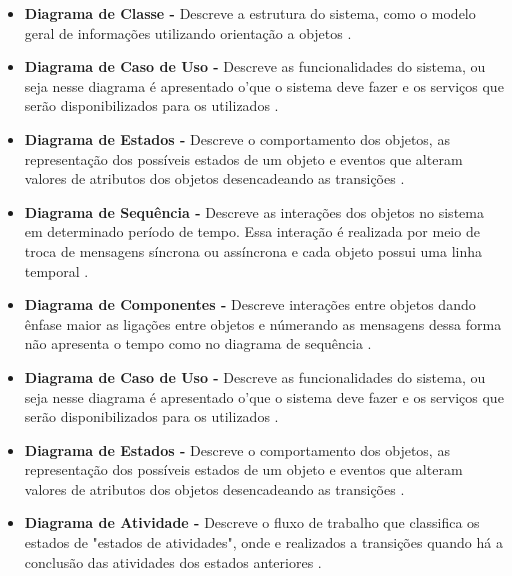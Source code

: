     \begin{itemize}
       \item \textbf{Diagrama de Classe -} 
       Descreve a estrutura do sistema, como o modelo geral de informações utilizando orientação a objetos \cite{nunesfundamental}.
        
        \item \textbf{Diagrama de Caso de Uso -} 
        Descreve as funcionalidades do sistema, ou seja nesse diagrama é apresentado o'que o sistema deve fazer e os serviços que serão disponibilizados para os utilizados \cite{nunesfundamental}.
        
        \item \textbf{Diagrama de Estados -} 
        Descreve o comportamento dos objetos, as representação dos possíveis estados de um objeto e eventos que alteram valores de atributos dos objetos desencadeando as transições \cite{uml}.
        
        \item \textbf{Diagrama de Sequência -} 
        Descreve as interações dos objetos no sistema em determinado período de tempo. Essa interação é realizada por meio de troca de mensagens síncrona ou assíncrona e cada objeto possui uma linha temporal \cite{uml}.
        
        \item \textbf{Diagrama de Componentes -}
        Descreve interações entre objetos dando ênfase maior as ligações entre objetos e númerando as mensagens dessa forma não apresenta o tempo como no diagrama de sequência \cite{uml}.
        
        \item \textbf{Diagrama de Caso de Uso -} 
        Descreve as funcionalidades do sistema, ou seja nesse diagrama é apresentado o'que o sistema deve fazer e os serviços que serão disponibilizados para os utilizados \cite{nunesfundamental}.
        
        \item \textbf{Diagrama de Estados -} 
        Descreve o comportamento dos objetos, as representação dos possíveis estados de um objeto e eventos que alteram valores de atributos dos objetos desencadeando as transições \cite{uml}.
        
        \item \textbf{Diagrama de Atividade -} 
        Descreve o fluxo de trabalho que classifica os estados de "estados de atividades", onde e realizados a transições quando há a conclusão das atividades dos estados anteriores \cite{uml}.
        

\end{itemize}
